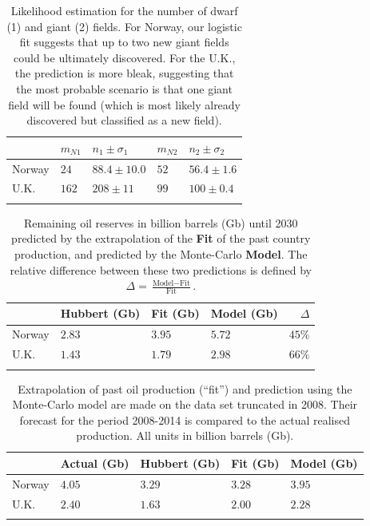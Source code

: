 \documentclass[review]{elsarticle}
\providecommand{\tabularnewline}{\\}
\begin{document}
\begin{table}[h]
\caption{\doublespacing
Likelihood estimation for the number of dwarf (1) and giant (2) fields. For Norway, our logistic fit suggests that up to two new giant fields could be ultimately discovered. For the U.K., the prediction is more bleak, suggesting that the most probable scenario is that one giant field will be found (which is most likely already discovered but classified as a new field).}
\centering %
\begin{tabular}{lllll}
 & $m_{N1}$ & $n_{1}\pm\sigma_{1}$ & $m_{N2}$ & $n_{2}\pm\sigma_{2}$\tabularnewline
\midrule Norway  & $24$ & $88.4\pm10.0$ & $52$ & $56.4\pm1.6$\tabularnewline
U.K. & $162$ & $208\pm11$ & $99$ & $100\pm0.4$\tabularnewline
\bottomrule  &  &  &  & \tabularnewline
\end{tabular}\label{likelihood-results}
\end{table}

\pagebreak


\begin{table}[H]
\caption{\doublespacing
Remaining oil reserves in billion barrels (Gb) until 2030 predicted by the extrapolation of the  \textbf{Fit} of the past country production, and predicted by the Monte-Carlo \textbf{Model}. The relative difference between these two predictions is defined by $\Delta=\frac{\textrm{Model}-\textrm{Fit}}{\textrm{Fit}}$.}
\centering %
\begin{tabular}{llllr}
 & Hubbert (Gb) & Fit (Gb) & Model (Gb)  & $\Delta$ \tabularnewline
\midrule Norway & $2.83$ & $3.95$ & $5.72$ & $45\%$\tabularnewline
U.K. & $1.43$ & $1.79$  & $2.98$ & $66\%$ \tabularnewline
\bottomrule  &  &  & \tabularnewline
\end{tabular}\label{forecast-14}
\end{table}

\pagebreak


\begin{table}[H]
\caption{\doublespacing
Extrapolation of past oil production (``fit'') and prediction
using the Monte-Carlo model are made on the data set truncated
in 2008. Their forecast for the period 2008-2014 is compared to
the actual realised production. All units in billion barrels (Gb).}
\centering %
\begin{tabular}{lllll}
 & Actual (Gb) & Hubbert (Gb) & Fit (Gb) & Model (Gb)\tabularnewline
\midrule Norway & $4.05$  & $3.29$  & $3.28$  & $3.95$ \tabularnewline
U.K. & $2.40$  & $1.63$  & $2.00$  & $2.28$ \tabularnewline
\bottomrule  &  &  & \tabularnewline
\end{tabular}\label{backtest-08}
\end{table}
\end{document}
